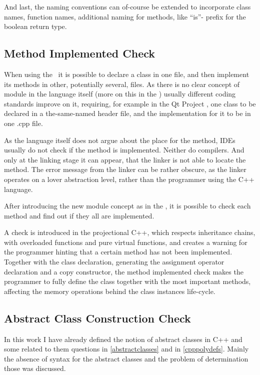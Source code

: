 And last, the naming conventions can of-course be extended to incorporate class names, function names, additional naming for methods,
like ``is''- prefix for the boolean return type. 


\subsection{Method Implemented Check}
\label{implementedcheck}

When using the \cpppl\ it is possible to declare a class in one file, and then implement its methods in other, potentially
several, files. As there is no clear concept of module in the language itself (more on this in the ) usually 
different coding standards improve on it, requiring, for example in the Qt Project \cite{qtcodingguide}, one class to be 
declared in a the-same-named header file, and the implementation for it to be in one .cpp file.

As the language itself does not argue about the place for the method, IDEs usually do not check if the method is implemented.
Neither do compilers. And only at the linking stage it can appear, that the linker is not able to locate the method. The error
message from the linker can be rather obscure, as the linker operates on a lover abstraction level, rather than the programmer 
using the C++ language. 

After introducing the new module concept as in the , it is possible to check each method and find out if they all 
are implemented. 

A check is introduced in the projectional C++, which respects inheritance chains, with overloaded functions and pure virtual functions,
and creates a warning for the programmer hinting that a certain method has not been implemented. Together with the class declaration, 
generating the assignment operator declaration and a copy constructor, the method implemented check makes the programmer to 
fully define the class together with the most important methods, affecting the memory operations behind the class instances life-cycle.


\subsection{Abstract Class Construction Check}

In this work I have already defined the notion of abstract classes in C++ and some related to them questions in \ref{abstractclasses} and
in \ref{cpppolydefs}. Mainly the absence of syntax for the abstract classes and the problem of determination those was discussed.


